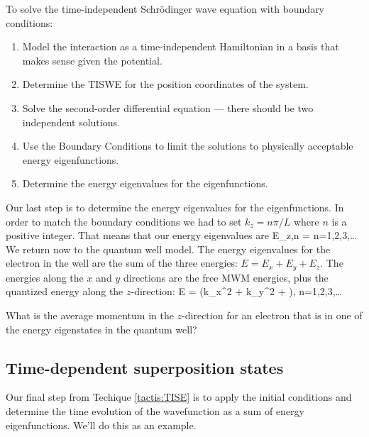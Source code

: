 \begin{tacticsbox}
\label{tactis:TISWEBC}
To solve the time-independent Schr\"{o}dinger wave equation with boundary conditions:
\begin{enumerate}
\item Model the interaction as a time-independent Hamiltonian in a basis that makes sense given the potential.
\item Determine the TISWE for the position coordinates of the system.
\item Solve the second-order differential equation --- there should be two independent solutions.
\item Use the Boundary Conditions to limit the solutions to physically acceptable energy eigenfunctions.
\item Determine the energy eigenvalues for the eigenfunctions.
\end{enumerate}
\end{tacticsbox}

Our last step is to determine the energy eigenvalues for the eigenfunctions. In order to match the boundary conditions we had to set $k_z = n\pi/L$ where $n$ is a positive integer. That means that our energy eigenvalues are
\beq
E_{z,n} =  n=1,2,3,\ldots
\label{eq:Eforinfwell}
\eeq
We return now to the quantum well model. The energy eigenvalues for the electron in the well are the sum of the three energies: $E = E_x + E_y + E_z$. The energies along the $x$ and $y$ directions are the free MWM energies, plus the quantized energy along the $z$-direction:
\beq
E = \left(k_x^2 + k_y^2 + \right), \qquad n=1,2,3,\ldots
\eeq

\begin{exercise}
What is the average momentum in the $z$-direction for an electron that is in one of the energy eigenstates in the quantum well?
\end{exercise}

\subsection{Time-dependent superposition states}
Our final step from Techique \ref{tactis:TISE} is to apply the initial conditions and determine the time evolution of the wavefunction as a sum of energy eigenfunctions. We'll do this as an example.

